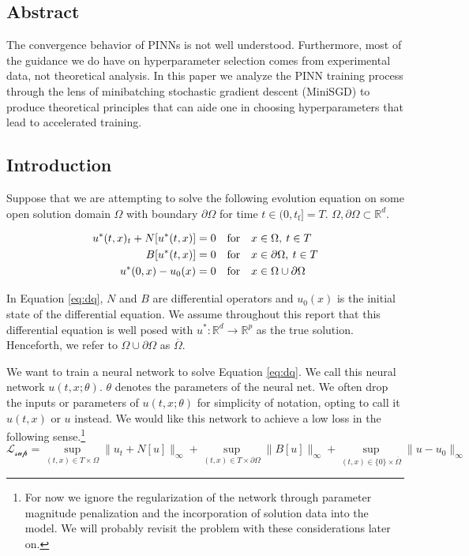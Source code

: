 \documentclass[12pt]{article}
\begin{document}
\subsection{Abstract}

The convergence behavior of PINNs is not well understood. Furthermore, most of the guidance we do have on hyperparameter selection comes from experimental data, not theoretical analysis. In this paper we analyze the PINN training process through the lens of minibatching stochastic gradient descent (MiniSGD) to produce theoretical principles that can aide one in choosing hyperparameters that lead to accelerated training.

\subsection{Introduction}

Suppose that we are attempting to solve the following evolution equation on some open solution domain $\Omega$ with boundary $\partial \Omega$ for time $t \in (0,t_{\text{f}}] = T$. $\Omega, \partial \Omega \subset \mathbb{R}^d$.

\begin{align} \label{eq:dq}
	u^*(t,x)_t + N[u^*(t,x)] = 0& \quad \text{for} \quad x \in \Omega, \: t \in T \notag\\
	B[u^*(t,x)] = 0& \quad \text{for} \quad x \in \partial \Omega , \: t \in T\\
	u^*(0,x) - u_0(x) = 0& \quad \text{for} \quad x \in \Omega \cup \partial \Omega \notag
\end{align} 

\noindent In Equation \ref{eq:dq}, $N$ and $B$ are differential operators and $u_0(x)$ is the initial state of the differential equation. We assume throughout this report that this differential equation is well posed with $u^*: \mathbb{R}^d \to \mathbb{R}^p$ as the true solution. Henceforth, we refer to $\Omega \cup \partial \Omega$ as $\overline{\Omega}$.

We want to train a neural network to solve Equation \ref{eq:dq}. We call this neural network $u(t,x;\theta)$. $\theta$ denotes the parameters of the neural net. We often drop the inputs or parameters of $u(t,x;\theta)$ for simplicity of notation, opting to call it $u(t,x)$ or $u$ instead. We would like this network to achieve a low loss in the following sense.\footnote{For now we ignore the regularization of the network through parameter magnitude penalization and the incorporation of solution data into the model. We will probably revisit the problem with these considerations later on.}
\begin{equation}
\mathcal{L_{\text{sup}}} = \sup_{(t,x) \in T \times\Omega} \| u_t + N[u] \|_{\infty} + \sup_{(t,x) \in T \times \partial \Omega} \| B[u] \|_{\infty} + \sup_{(t,x) \in \{0\} \times \overline{\Omega}} \| u - u_0 \|_{\infty}
\end{equation}
\end{document}
